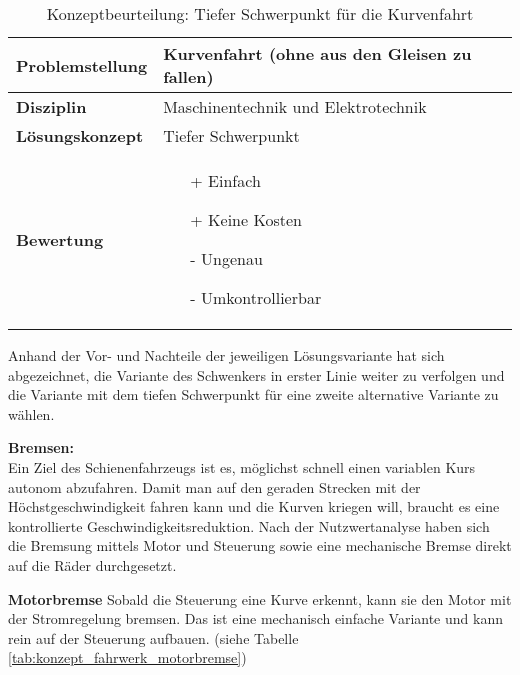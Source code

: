 \documentclass[../../main.tex]{subfiles}
\begin{document}
    \begin{flushleft}
        \begin{table}[h]
        \begin{tabular}{ | l | p{11cm} |}
        \hline
        \textbf{Problemstellung} & Kurvenfahrt (ohne aus den Gleisen zu fallen) \\ \hline
        \textbf{Disziplin} & Maschinentechnik und Elektrotechnik \\ \hline
        \textbf{Lösungskonzept} & Tiefer Schwerpunkt \\ \hline
        \textbf{Bewertung} &  \begin{itemize}
                                \item[+] Einfach
                                \item[+] Keine Kosten
                                \item[-] Ungenau 
                                \item[-] Umkontrollierbar 
                              \end{itemize} \\ \hline
        \end{tabular}
        \caption{Konzeptbeurteilung: Tiefer Schwerpunkt für die Kurvenfahrt}
        \label{tab:konzept_fahrwerk_tieferschwerpunkt}
    \end{table}
    \end{flushleft}

    Anhand der Vor- und Nachteile der jeweiligen Lösungsvariante hat sich abgezeichnet, die Variante des Schwenkers in erster Linie weiter zu verfolgen und die Variante mit dem tiefen Schwerpunkt für eine zweite alternative Variante zu wählen.
    
    \textbf{Bremsen:}\\
    Ein Ziel des Schienenfahrzeugs ist es, möglichst schnell einen variablen Kurs autonom abzufahren. Damit man auf den geraden Strecken mit der Höchstgeschwindigkeit fahren kann und die Kurven kriegen will, braucht es eine kontrollierte Geschwindigkeitsreduktion. Nach der Nutzwertanalyse haben sich die Bremsung mittels Motor und Steuerung sowie eine mechanische Bremse direkt auf die Räder durchgesetzt.

    \textbf{Motorbremse}
    Sobald die Steuerung eine Kurve erkennt, kann sie den Motor mit der Stromregelung bremsen. Das ist eine mechanisch einfache Variante und kann rein auf der Steuerung aufbauen. (siehe Tabelle \ref{tab:konzept_fahrwerk_motorbremse})
\end{document}
